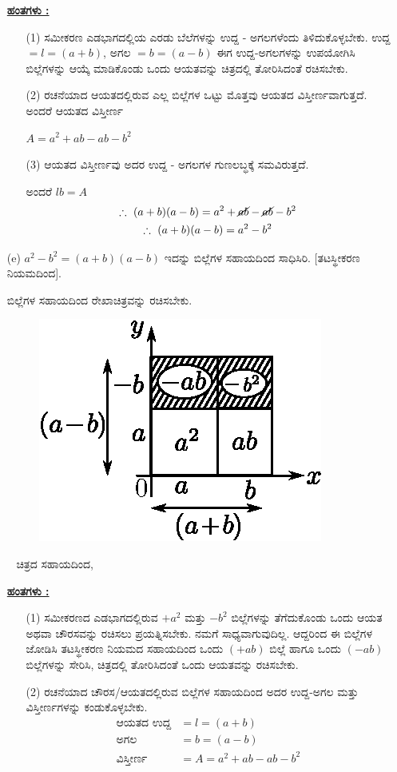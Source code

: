 \begin{enumerate}
\noindent
{\textbf{\underline{ಹಂತಗಳು :}}}
\begin{itemize}
\item[(1)] ಸಮೀಕರಣ ಎಡಭಾಗದಲ್ಲಿಯ ಎರಡು ಬೆಲೆಗಳನ್ನು ಉದ್ದ - ಅಗಲಗಳೆಂದು ತಿಳಿದುಕೊಳ್ಳಬೇಕು. ಉದ್ದ $= l = (a+b)$, ಅಗಲ $= b = (a-b)$ ಈಗ ಉದ್ದ-ಅಗಲಗಳನ್ನು ಉಪಯೋಗಿಸಿ ಬಿಲ್ಲೆಗಳನ್ನು ಆಯ್ಕೆ ಮಾಡಿಕೊಂಡು ಒಂದು ಆಯತವನ್ನು ಚಿತ್ರದಲ್ಲಿ ತೋರಿಸಿದಂತೆ ರಚಿಸಬೇಕು. 
\item[(2)] ರಚನೆಯಾದ ಆಯತದಲ್ಲಿರುವ ಎಲ್ಲ ಬಿಲ್ಲೆಗಳ ಒಟ್ಟು ಮೊತ್ತವು ಆಯತದ ವಿಸ್ತೀರ್ಣ\-ವಾಗುತ್ತದೆ. ಅಂದರೆ ಆಯತದ ವಿಸ್ತೀರ್ಣ 

$A = a^2 + ab - ab - b^2$
\item[(3)] ಆಯತದ ವಿಸ್ತೀರ್ಣವು ಅದರ ಉದ್ದ - ಅಗಲಗಳ ಗುಣಲಬ್ಧಕ್ಕೆ ಸಮವಿರುತ್ತದೆ. 

ಅಂದರೆ $lb = A$
\begin{gather*}
\therefore~ (a+b)(a-b) = a^2 + \cancel{ab} - \cancel{ab} - b^2\\
\therefore~ (a+b)(a-b) = a^2 - b^2
\end{gather*}

\end{itemize}

\item[(e)] $a^2 - b^2 = (a+b)(a-b)$ ಇದನ್ನು ಬಿಲ್ಲೆಗಳ ಸಹಾಯದಿಂದ ಸಾಧಿಸಿರಿ. [ತಟಸ್ಥೀಕರಣ ನಿಯಮದಿಂದ].

ಬಿಲ್ಲೆಗಳ ಸಹಾಯದಿಂದ ರೇಖಾಚಿತ್ರವನ್ನು ರಚಿಸಬೇಕು.
\begin{figure}[H]
\centering
\includegraphics[scale=0.8]{src/figure/chap3/fig3-32e.eps}
\end{figure}
~
\vskip -0.5cm
ಚಿತ್ರದ ಸಹಾಯದಿಂದ,

\noindent
{\textbf{\underline{ಹಂತಗಳು :}}}
\begin{itemize}
\item[(1)] ಸಮೀಕರಣದ ಎಡಭಾಗದಲ್ಲಿರುವ $+a^2$ ಮತ್ತು $-b^2$ ಬಿಲ್ಲೆಗಳನ್ನು ತೆಗೆದುಕೊಂಡು ಒಂದು ಆಯತ ಅಥವಾ ಚೌರಸವನ್ನು ರಚಿಸಲು ಪ್ರಯತ್ನಿಸಬೇಕು. ನಮಗೆ ಸಾಧ್ಯವಾಗುವುದಿಲ್ಲ. ಆದ್ದರಿಂದ ಈ ಬಿಲ್ಲೆಗಳ ಜೋಡಿಸಿ ತಟಸ್ಥೀಕರಣ ನಿಯಮದ ಸಹಾಯದಿಂದ ಒಂದು $(+ab)$ ಬಿಲ್ಲೆ ಹಾಗೂ ಒಂದು $(-ab)$ ಬಿಲ್ಲೆಗಳನ್ನು ಸೇರಿಸಿ, ಚಿತ್ರದಲ್ಲಿ ತೋರಿಸಿದಂತೆ ಒಂದು ಆಯತವನ್ನು ರಚಿಸಬೇಕು. 
\item[(2)] ರಚನೆಯಾದ ಚೌರಸ/ಆಯತದಲ್ಲಿರುವ ಬಿಲ್ಲೆಗಳ ಸಹಾಯದಿಂದ ಅದರ ಉದ್ದ-ಅಗಲ ಮತ್ತು ವಿಸ್ತೀರ್ಣಗಳನ್ನು ಕಂಡುಕೊಳ್ಳಬೇಕು.
\begin{align*}
\text{ಆಯತದ ಉದ್ದ}& = l = (a+b)\\
\text{ಅಗಲ} & = b = (a-b)\\
\text{ವಿಸ್ತೀರ್ಣ} & = A = a^2 + ab - ab - b^2
\end{align*}


\end{itemize}
\end{enumerate}
